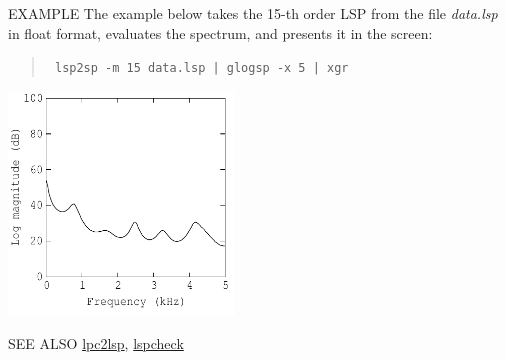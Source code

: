 \begin{options}
\end{options}

\begin{qsection}{EXAMPLE}
The example below takes the 15-th order LSP from the file
 {\em data.lsp} in float format, evaluates the spectrum,
 and presents it in the screen:
\begin{quote}
 \verb! lsp2sp -m 15 data.lsp | glogsp -x 5 | xgr ! 
\end{quote}
\begin{center}
\includegraphics[width=6cm]{fig/lsp2sp.pdf}
\end{center}
\end{qsection}

\begin{qsection}{SEE ALSO}
\hyperlink{lpc2lsp}{lpc2lsp},
\hyperlink{lspcheck}{lspcheck}
\end{qsection}
